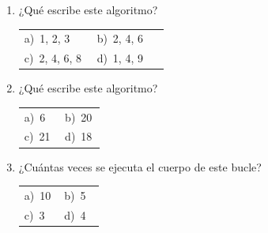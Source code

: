 \documentclass[11pt,a4paper]{article}
\begin{document}
\begin{enumerate}[label=\textbf{\arabic*.},leftmargin=*,itemsep=11pt,topsep=0pt]
\item \begin{minipage}[t]{\linewidth}
¿Qué escribe este algoritmo?

\vspace{2pt}{\small
\begin{verbatim}
PARA i ← 1 HASTA 3 HACER
   ESCRIBIR i * 2
FIN_PARA
\end{verbatim}}


\vspace{4pt}
\begin{tabular}{@{}p{0.47\linewidth}p{0.47\linewidth}@{}}
a)~1, 2, 3 & b)~2, 4, 6 \\
c)~2, 4, 6, 8 & d)~1, 4, 9 \\
\end{tabular}
\end{minipage}

\item \begin{minipage}[t]{\linewidth}
¿Qué escribe este algoritmo?

\vspace{2pt}{\small
\begin{verbatim}
INICIO
   ENTERO i, suma
   suma ← 0
   PARA i ← 2 HASTA 6 HACER
      suma ← suma + i
   FIN_PARA
   ESCRIBIR suma
FIN
\end{verbatim}}


\vspace{4pt}
\begin{tabular}{@{}p{0.47\linewidth}p{0.47\linewidth}@{}}
a)~6 & b)~20 \\
c)~21 & d)~18 \\
\end{tabular}
\end{minipage}

\item \begin{minipage}[t]{\linewidth}
¿Cuántas veces se ejecuta el cuerpo de este bucle?

\vspace{2pt}{\small
\begin{verbatim}
i ← 0
MIENTRAS i < 10 HACER
   i ← i + 3
FIN_MIENTRAS
\end{verbatim}}


\vspace{4pt}
\begin{tabular}{@{}p{0.47\linewidth}p{0.47\linewidth}@{}}
a)~10 & b)~5 \\
c)~3 & d)~4 \\
\end{tabular}
\end{minipage}


\end{enumerate}
\end{document}

